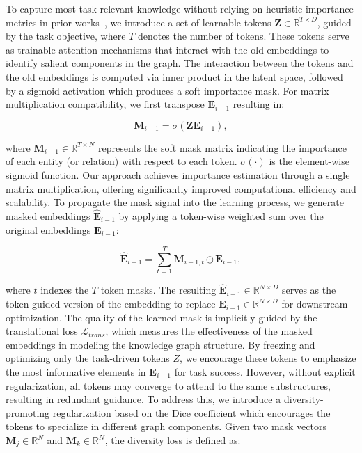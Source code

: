 \documentclass[runningheads]{llncs}
\begin{document}
To capture most task-relevant knowledge without relying on heuristic importance metrics in prior works~\cite{cui2023lifelong,liu2024towards}, we introduce a set of learnable tokens $\mathbf{Z} \in \mathbb{R}^{T \times D}$, guided by the task objective, where $T$ denotes the number of tokens. These tokens serve as trainable attention mechanisms that interact with the old embeddings to identify salient components in the graph. The interaction between the tokens and the old embeddings is computed via inner product in the latent space, followed by a sigmoid activation which produces a soft importance mask. For matrix multiplication compatibility, we first transpose $\mathbf{E}_{i-1}$ resulting in:

\begin{equation} 
    \mathbf{M}_{i-1} = \sigma(\mathbf{Z} \mathbf{E}_{i-1}), 
\end{equation}

\noindent where $\mathbf{M}_{i-1} \in \mathbb{R}^{T \times N}$ represents the soft mask matrix indicating the importance of each entity (or relation) with respect to each token. $\sigma(\cdot)$ is the element-wise sigmoid function. Our approach achieves importance estimation through a single matrix multiplication, offering significantly improved computational efficiency and scalability. To propagate the mask signal into the learning process, we generate masked embeddings $\mathbf{\hat{E}}_{i-1}$ by applying a token-wise weighted sum over the original embeddings $\mathbf{E}_{i-1}$:

\begin{equation} 
\mathbf{\hat{E}}_{i-1} = \sum_{t=1}^{T} \mathbf{M}_{i-1,t} \odot \mathbf{E}_{i-1}, 
\end{equation}

\noindent where $t$ indexes the $T$ token masks. The resulting $\hat{\mathbf{E}}_{i-1} \in \mathbb{R}^{N \times D}$ serves as the token-guided version of the embedding to replace $\mathbf{E}_{i-1}\in \mathbb{R}^{N \times D}$ for downstream optimization. The quality of the learned mask is implicitly guided by the translational loss $\mathcal{L}_{trans}$, which measures the effectiveness of the masked embeddings in modeling the knowledge graph structure. By freezing and optimizing only the task-driven tokens $Z$, we encourage these tokens to emphasize the most informative elements in $\mathbf{E}_{i-1}$ for task success. However, without explicit regularization, all tokens may converge to attend to the same substructures, resulting in redundant guidance. To address this, we introduce a diversity-promoting regularization based on the Dice coefficient which encourages the tokens to specialize in different graph components. Given two mask vectors $\mathbf{M}_{j} \in \mathbb{R}^{N}$ and $\mathbf{M}_{k} \in \mathbb{R}^{N}$, the diversity loss is defined as:
\end{document}
